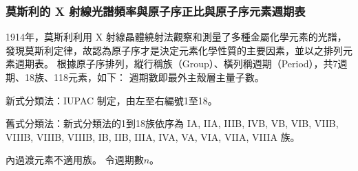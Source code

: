 \documentclass[a4paper,12pt]{article}
\begin{document}
\subsubsection{莫斯利的 X 射線光譜頻率與原子序正比與原子序元素週期表}
1914年，莫斯利利用 X 射線晶體繞射法觀察和測量了多種金屬化學元素的光譜，發現莫斯利定律，故認為原子序才是決定元素化學性質的主要因素，並以之排列元素週期表。 
根據原子序排列，縱行稱族（Group）、橫列稱週期（Period），共7週期、18族、118元素，如下：
\bctf{}\efct
\bctf{}\efct
{}
週期數即最外主殼層主量子數。
\bit
\item 新式分類法：IUPAC 制定，由左至右編號1至18。
\item 舊式分類法：新式分類法的1到18族依序為 IA, IIA, IIIB, IVB, VB, VIB, VIIB, VIIIB, VIIIB, VIIIB, IB, IIB, IIIA, IVA, VA, VIA, VIIA, VIIIA 族。
\item 內過渡元素不適用族。
\eit
{}
令週期數$n$。
\end{document}
